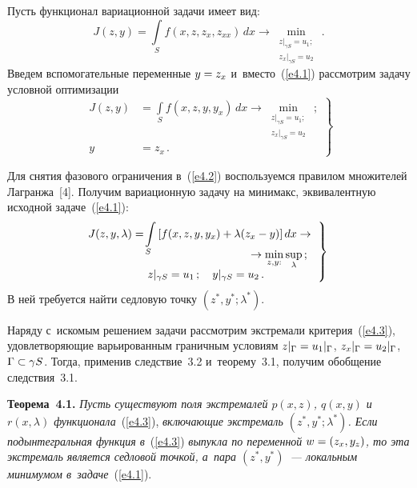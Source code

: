 \begin{multicols}{2}
    Пусть функционал вариационной задачи имеет вид:
\begin{equation}
J(z,y) =\int\limits_S f(x,z,z_x, z_{xx})\,dx \to \min\limits_{\substack{{z\vert_{\gamma S}=u_1;}\\
{z_x\vert_{\gamma S}=u_2}}}\,.
\label{e4.1}
\end{equation}
    Введем вспомогательные переменные $y\hm =z_x$ и~вмес\-то~(\ref{e4.1}) 
рассмотрим задачу условной оптимизации
    \begin{equation}
    \left.
    \begin{array}{rl}
    J(z,y) &=\displaystyle \int\limits_S f(x,z,y,y_x)\,dx\to \min\limits_{\substack{{z\vert_{\gamma 
S}=u_1;}\\ {z_x\vert_{\gamma S}=u_2}}}\,;\\[6pt]
    y&=z_x\,.
    \end{array}
    \right\}
    \label{e4.2}
    \end{equation}
    
    
    Для снятия фазового ограничения в~(\ref{e4.2}) воспользуемся правилом 
множителей Лагранжа~[4]. Получим вариационную задачу на минимакс, 
эквивалентную исходной задаче~(\ref{e4.1}):
    \begin{equation}
    \left.
    \begin{array}{c}
    \hspace*{-3mm}J(z,y,\lambda) =\displaystyle \!\int\limits_S \left[ f(x,z,y,y_x)+\lambda(z_x-
y)\right]dx\to {}\\[-6pt]
{}\hspace*{45mm}\to \min\limits_{z,y:}\mathop{\mathrm{sup}}\limits_{\lambda}\,;\\
    z\vert_{\gamma S} =u_1\,;\quad y\vert_{\gamma S} =u_2\,.
    \end{array}
    \!\right\}\!
    \label{e4.3}
    \end{equation}
В ней требуется найти седловую точку $(z^*, y^*; \lambda^*)$.

\columnbreak 
    
    Наряду с~искомым решением задачи рас\-смот\-рим экстремали 
критерия~(\ref{e4.3}), удовлетворяющие варьированным граничным условиям 
    $z\vert_\Gamma \hm= u_1\vert_\Gamma$, $z_x\vert_\Gamma\hm= 
u_2\vert_\Gamma$, $\Gamma\hm\subset \gamma S$. Тогда, применив следствие~3.2 
и~теорему~3.1, получим обобщение следствия~3.1. 
    
    \smallskip
    
    \noindent
    \textbf{Теорема~4.1.} \textit{Пусть существуют поля экстремалей $p(x,z)$, 
$q(x,y)$ и~$r(x,\lambda)$ функционала}~(\ref{e4.3}), \textit{вклю\-ча\-ющие экстремаль 
$(z^*, y^*; \lambda^*)$. Если подынтегральная функция в}~(\ref{e4.3}) 
\textit{выпукла по переменной $w\hm= (z_x, y_z)$, то эта экстремаль является 
седловой точкой, а~пара $(z^*, y^*)$~--- локальным минимумом 
в~задаче}~(\ref{e4.1}).
    

\end{multicols}
